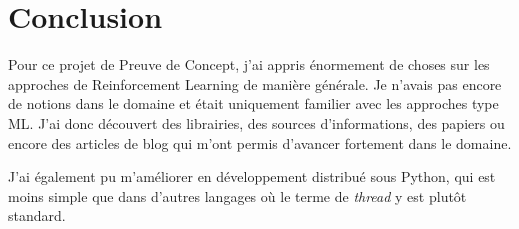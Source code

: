\section{Conclusion}

Pour ce projet de Preuve de Concept, j'ai appris énormement de choses sur les approches de Reinforcement Learning de manière générale. Je n'avais pas encore de notions dans le domaine et était uniquement familier avec les approches type ML. J'ai donc découvert des librairies, des sources d'informations, des papiers ou encore des articles de blog qui m'ont permis d'avancer fortement dans le domaine.

J'ai également pu m'améliorer en développement distribué sous Python, qui est moins simple que dans d'autres langages où le terme de \textit{thread} y est plutôt standard.